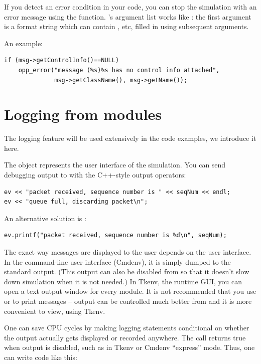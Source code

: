 If you detect an error condition in your code, you can stop the
simulation with an error message using the  function.
's argument list works like : the
first argument is a format string which can contain ,  etc,
filled in using subsequent arguments.

An example:

\begin{verbatim}
if (msg->getControlInfo()==NULL)
    opp_error("message (%s)%s has no control info attached",
              msg->getClassName(), msg->getName());
\end{verbatim}



\section{Logging from modules}

The logging feature will be used extensively in the code examples,
we introduce it here.

The  object represents the user interface of the
simulation.  You can send debugging output to  with the C++-style
output operators:

\begin{verbatim}
ev << "packet received, sequence number is " << seqNum << endl;
ev << "queue full, discarding packet\n";
\end{verbatim}

An alternative solution is :

\begin{verbatim}
ev.printf("packet received, sequence number is %d\n", seqNum);
\end{verbatim}

The exact way messages are displayed to the user depends on the user
interface. In the command-line user interface (Cmdenv),
it is simply dumped to the standard output. (This output can also be
disabled from  so that it doesn't slow down simulation
when it is not needed.) In Tkenv, the runtime GUI, you can open
a text output window for every module.
It is not recommended that you use  or 
to print messages --  output can be controlled much better
from  and it is more convenient to view, using Tkenv.

One can save CPU cycles by making logging statements conditional
on whether the output actually gets displayed or recorded anywhere.
The  call returns true when  output is disabled,
such as in Tkenv or Cmdenv ``express'' mode. Thus, one can write code like
this:

